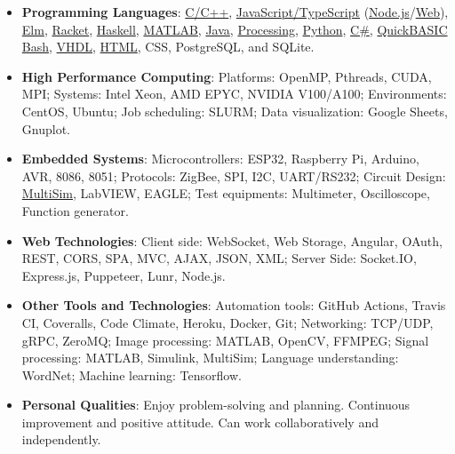 \begin{itemize}[noitemsep, leftmargin=*]
  \item \textbf{Programming Languages}:
    \href{https://github.com/puzzlef}{C/C++},
    \href{https://github.com/javascriptf}{JavaScript/TypeScript} (\href{https://github.com/nodef}{Node.js}/\href{https://github.com/htmlf}{Web}),
    \href{https://github.com/elmw}{Elm},
    \href{https://github.com/racketf}{Racket},
    \href{https://github.com/interpreterz}{Haskell},
    \href{https://github.com/matlabf}{MATLAB},
    \href{https://github.com/javaf}{Java},
    \href{https://github.com/processingf}{Processing},
    \href{https://github.com/python3f}{Python},
    \href{https://github.com/winp}{C\#},
    \href{https://github.com/qb40}{QuickBASIC}
    \href{https://github.com/bashf}{Bash},
    \href{https://github.com/vhdlf}{VHDL},
    \href{https://github.com/htmlf}{HTML},
    CSS, PostgreSQL, and SQLite.
  \item \textbf{High Performance Computing}:
    Platforms: OpenMP, Pthreads, CUDA, MPI;
    Systems: Intel Xeon, AMD EPYC, NVIDIA V100/A100;
    Environments: CentOS, Ubuntu;
    Job scheduling: SLURM;
    Data visualization: Google Sheets, Gnuplot.
  \item \textbf{Embedded Systems}:
    Microcontrollers: ESP32, Raspberry Pi, Arduino, AVR, 8086, 8051;
    Protocols: ZigBee, SPI, I2C, UART/RS232;
    Circuit Design: \href{https://github.com/electronicsf}{MultiSim}, LabVIEW, EAGLE;
    Test equipments: Multimeter, Oscilloscope, Function generator.
  \item \textbf{Web Technologies}:
    Client side: WebSocket, Web Storage, Angular, OAuth, REST, CORS, SPA, MVC, AJAX, JSON, XML;
    Server Side: Socket.IO, Express.js, Puppeteer, Lunr, Node.js.
  \item \textbf{Other Tools and Technologies}:
    Automation tools: GitHub Actions, Travis CI, Coveralls, Code Climate, Heroku, Docker, Git;
    Networking: TCP/UDP, gRPC, ZeroMQ;
    Image processing: MATLAB, OpenCV, FFMPEG;
    Signal processing: MATLAB, Simulink, MultiSim;
    Language understanding: WordNet;
    Machine learning: Tensorflow.
  \item \textbf{Personal Qualities}:
    Enjoy problem-solving and planning.
    Continuous improvement and positive attitude.
    Can work collaboratively and independently.
\end{itemize}
